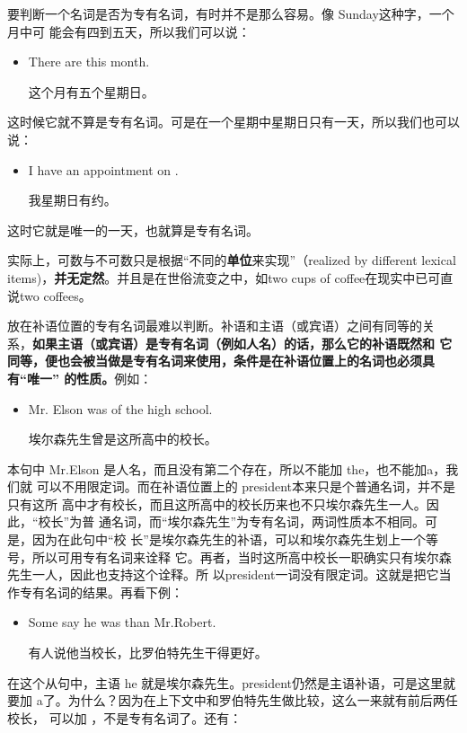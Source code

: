 要判断一个名词是否为专有名词，有时并不是那么容易。像 Sunday这种字，一个月中可
能会有四到五天，所以我们可以说：
\begin{itemize}
\item There are  this month.

  这个月有五个星期日。
\end{itemize}

这时候它就不算是专有名词。可是在一个星期中星期日只有一天，所以我们也可以说：
\begin{itemize}
\item I have an appointment on .

  我星期日有约。
\end{itemize}

这时它就是唯一的一天，也就算是专有名词。

实际上，可数与不可数只是根据“不同的\textbf{单位}来实现”（realized by
different lexical items)，\textbf{并无定然}。并且是在世俗流变之中，如two
cups of coffee在现实中已可直说two coffees。

放在补语位置的专有名词最难以判断。补语和主语（或宾语）之间有同等的关
系，\textbf{如果主语（或宾语）是专有名词（例如人名）的话，那么它的补语既然和
  它同等，便也会被当做是专有名词来使用，条件是在补语位置上的名词也必须具
  有“唯一” 的性质。}例如：

\begin{itemize}
\item Mr. Elson was  of the high school.

  埃尔森先生曾是这所高中的校长。
\end{itemize}

本句中 Mr.Elson 是人名，而且没有第二个存在，所以不能加 the，也不能加a，我们就
可以不用限定词。而在补语位置上的 president本来只是个普通名词，并不是只有这所
高中才有校长，而且这所高中的校长历来也不只埃尔森先生一人。因此，“校长”为普
通名词，而“埃尔森先生”为专有名词，两词性质本不相同。可是，因为在此句中“校
长”是埃尔森先生的补语，可以和埃尔森先生划上一个等号，所以可用专有名词来诠释
它。再者，当时这所高中校长一职确实只有埃尔森先生一人，因此也支持这个诠释。所
以president一词没有限定词。这就是把它当作专有名词的结果。再看下例：
\begin{itemize}
\item Some say he was  than Mr.Robert.

  有人说他当校长，比罗伯特先生干得更好。
\end{itemize}

在这个从句中，主语 he 就是埃尔森先生。president仍然是主语补语，可是这里就
要加 a了。为什么？因为在上下文中和罗伯特先生做比较，这么一来就有前后两任校长，
可以加 ，不是专有名词了。还有：

